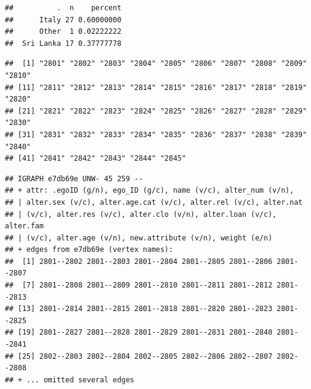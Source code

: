 \documentclass[
]{book}
\newenvironment{Shaded}{\begin{snugshade}}{\end{snugshade}}
\newcommand{\CommentTok}[1]{\textcolor[rgb]{0.56,0.35,0.01}{\textit{#1}}}
\newcommand{\DecValTok}[1]{\textcolor[rgb]{0.00,0.00,0.81}{#1}}
\newcommand{\FunctionTok}[1]{\textcolor[rgb]{0.00,0.00,0.00}{#1}}
\newcommand{\NormalTok}[1]{#1}
\newcommand{\OtherTok}[1]{\textcolor[rgb]{0.56,0.35,0.01}{#1}}
\newcommand{\SpecialCharTok}[1]{\textcolor[rgb]{0.00,0.00,0.00}{#1}}
\begin{document}
\begin{Shaded}
\end{Shaded}

\begin{verbatim}
##          .  n    percent
##      Italy 27 0.60000000
##      Other  1 0.02222222
##  Sri Lanka 17 0.37777778
\end{verbatim}

\begin{Shaded}
\end{Shaded}

\begin{verbatim}
##  [1] "2801" "2802" "2803" "2804" "2805" "2806" "2807" "2808" "2809" "2810"
## [11] "2811" "2812" "2813" "2814" "2815" "2816" "2817" "2818" "2819" "2820"
## [21] "2821" "2822" "2823" "2824" "2825" "2826" "2827" "2828" "2829" "2830"
## [31] "2831" "2832" "2833" "2834" "2835" "2836" "2837" "2838" "2839" "2840"
## [41] "2841" "2842" "2843" "2844" "2845"
\end{verbatim}

\begin{Shaded}
\end{Shaded}

\begin{verbatim}
## IGRAPH e7db69e UNW- 45 259 -- 
## + attr: .egoID (g/n), ego_ID (g/c), name (v/c), alter_num (v/n),
## | alter.sex (v/c), alter.age.cat (v/c), alter.rel (v/c), alter.nat
## | (v/c), alter.res (v/c), alter.clo (v/n), alter.loan (v/c), alter.fam
## | (v/c), alter.age (v/n), new.attribute (v/n), weight (e/n)
## + edges from e7db69e (vertex names):
##  [1] 2801--2802 2801--2803 2801--2804 2801--2805 2801--2806 2801--2807
##  [7] 2801--2808 2801--2809 2801--2810 2801--2811 2801--2812 2801--2813
## [13] 2801--2814 2801--2815 2801--2818 2801--2820 2801--2823 2801--2825
## [19] 2801--2827 2801--2828 2801--2829 2801--2831 2801--2840 2801--2841
## [25] 2802--2803 2802--2804 2802--2805 2802--2806 2802--2807 2802--2808
## + ... omitted several edges
\end{verbatim}
\end{document}
